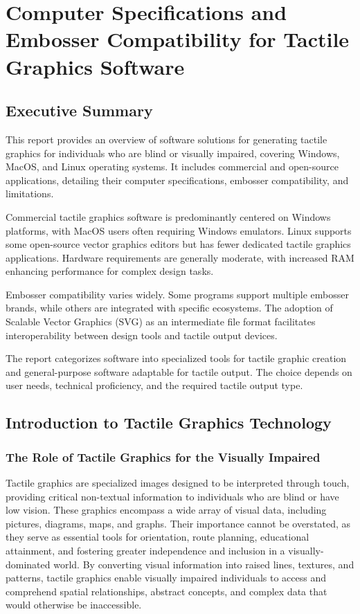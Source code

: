 \chapter{Computer Specifications and Embosser Compatibility for Tactile Graphics Software}

\section{Executive Summary}

This report provides an overview of software solutions for generating tactile graphics for individuals who are blind or visually impaired, covering Windows, MacOS, and Linux operating systems. It includes commercial and open-source applications, detailing their computer specifications, embosser compatibility, and limitations.

Commercial tactile graphics software is predominantly centered on Windows platforms, with MacOS users often requiring Windows emulators. Linux supports some open-source vector graphics editors but has fewer dedicated tactile graphics applications. Hardware requirements are generally moderate, with increased RAM enhancing performance for complex design tasks.

Embosser compatibility varies widely. Some programs support multiple embosser brands, while others are integrated with specific ecosystems. The adoption of Scalable Vector Graphics (SVG) as an intermediate file format facilitates interoperability between design tools and tactile output devices.

The report categorizes software into specialized tools for tactile graphic creation and general-purpose software adaptable for tactile output. The choice depends on user needs, technical proficiency, and the required tactile output type.

\section{Introduction to Tactile Graphics Technology}

\subsection{The Role of Tactile Graphics for the Visually Impaired}

Tactile graphics are specialized images designed to be interpreted through touch, providing critical non-textual information to individuals who are blind or have low vision. These graphics encompass a wide array of visual data, including pictures, diagrams, maps, and graphs. Their importance cannot be overstated, as they serve as essential tools for orientation, route planning, educational attainment, and fostering greater independence and inclusion in a visually-dominated world. By converting visual information into raised lines, textures, and patterns, tactile graphics enable visually impaired individuals to access and comprehend spatial relationships, abstract concepts, and complex data that would otherwise be inaccessible. \cite{Perkins,TactileView,NYUMaps,TouchMapper,AELData}

